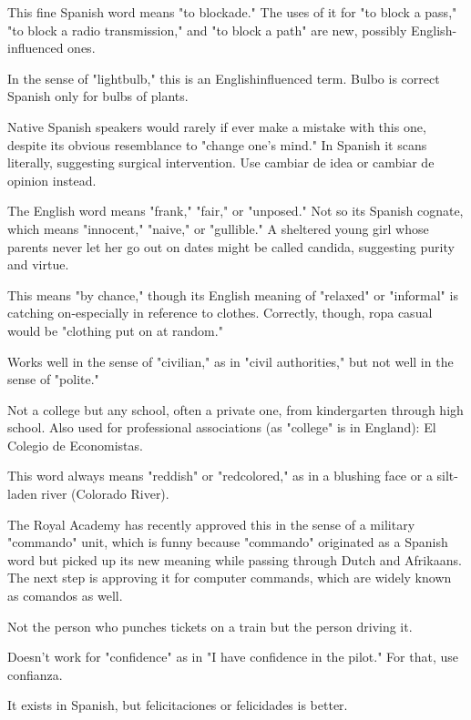  This fine Spanish word means "to blockade."
The uses of it for "to block a pass," "to block a radio transmission,"
and "to block a path" are new, possibly English-influenced ones.

 In the sense of "lightbulb," this is an Englishinfluenced term. Bulbo is correct Spanish only for bulbs of plants.

 Native Spanish speakers would rarely if
ever make a mistake with this one, despite its obvious resemblance to
"change one's mind." In Spanish it scans literally, suggesting surgical
intervention. Use cambiar de idea or cambiar de opinion instead.

 The English word means "frank," "fair," or "unposed." Not so its Spanish cognate, which means "innocent," "naive,"
or "gullible." A sheltered young girl whose parents never let her go out
on dates might be called candida, suggesting purity and virtue.

 This means "by chance," though its English meaning of "relaxed" or "informal" is catching on-especially in reference
to clothes. Correctly, though, ropa casual would be "clothing put on at
random."

 Works well in the sense of "civilian," as in "civil authorities," but not well in the sense of "polite."

 Not a college but any school, often a private one,
from kindergarten through high school. Also used for professional associations (as "college" is in England): El Colegio de Economistas.

 This word always means "reddish" or "redcolored," as in a blushing face or a silt-laden river (Colorado River).

 The Royal Academy has recently approved this in
the sense of a military "commando" unit, which is funny because "commando" originated as a Spanish word but picked up its new meaning
while passing through Dutch and Afrikaans. The next step is approving it for computer commands, which are widely known as comandos
as well.

 Not the person who punches tickets on a train
but the person driving it.

 Doesn't work for "confidence" as in "I have
confidence in the pilot." For that, use confianza.

 It exists in Spanish, but felicitaciones
or felicidades is better.

